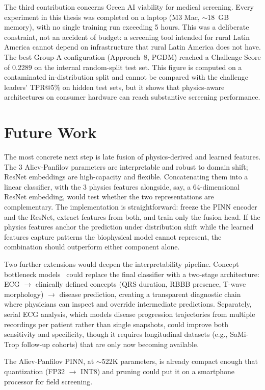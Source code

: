 The third contribution concerns Green AI viability for medical screening. Every experiment in this thesis was completed on a laptop (M3 Mac, $\sim$18~GB memory), with no single training run exceeding 5 hours. This was a deliberate constraint, not an accident of budget: a screening tool intended for rural Latin America cannot depend on infrastructure that rural Latin America does not have. The best Group-A configuration (Approach~8, PGDM) reached a Challenge Score of 0.2289 on the internal random-split test set. This figure is computed on a contaminated in-distribution split and cannot be compared with the challenge leaders' TPR@5\% on hidden test sets, but it shows that physics-aware architectures on consumer hardware can reach substantive screening performance.

\section{Future Work}

The most concrete next step is late fusion of physics-derived and learned features. The 3 Aliev-Panfilov parameters are interpretable and robust to domain shift; ResNet embeddings are high-capacity and flexible. Concatenating them into a linear classifier, with the 3 physics features alongside, say, a 64-dimensional ResNet embedding, would test whether the two representations are complementary. The implementation is straightforward: freeze the PINN encoder and the ResNet, extract features from both, and train only the fusion head. If the physics features anchor the prediction under distribution shift while the learned features capture patterns the biophysical model cannot represent, the combination should outperform either component alone.

Two further extensions would deepen the interpretability pipeline. Concept bottleneck models~\cite{koh2020concept} could replace the final classifier with a two-stage architecture: ECG $\to$ clinically defined concepts (QRS duration, RBBB presence, T-wave morphology) $\to$ disease prediction, creating a transparent diagnostic chain where physicians can inspect and override intermediate predictions. Separately, serial ECG analysis, which models disease progression trajectories from multiple recordings per patient rather than single snapshots, could improve both sensitivity and specificity, though it requires longitudinal datasets (e.g., SaMi-Trop follow-up cohorts) that are only now becoming available.

The Aliev-Panfilov PINN, at $\sim$522K parameters, is already compact enough that quantization (FP32 $\to$ INT8) and pruning could put it on a smartphone processor for field screening.

